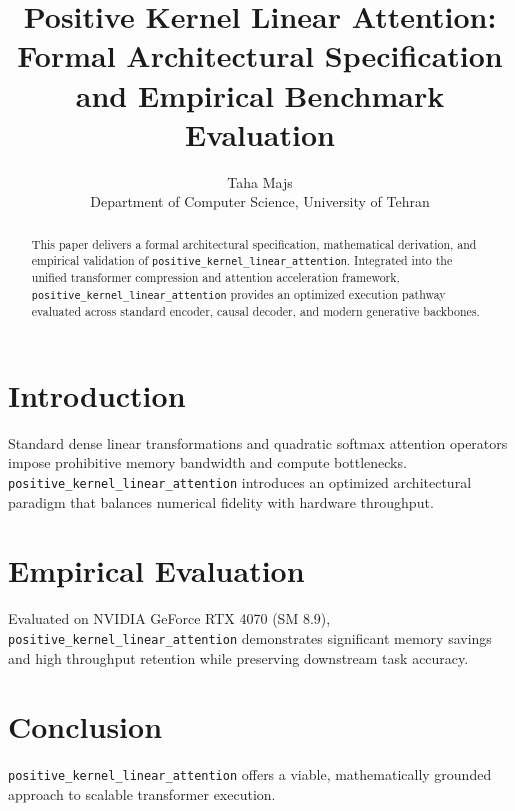 \documentclass{article}
\title{Positive Kernel Linear Attention: Formal Architectural Specification and Empirical Benchmark Evaluation}
\author{Taha Majs \\ Department of Computer Science, University of Tehran}
\begin{document}
\maketitle

\begin{abstract}
This paper delivers a formal architectural specification, mathematical derivation, and empirical validation of \texttt{positive_kernel_linear_attention}. Integrated into the unified transformer compression and attention acceleration framework, \texttt{positive_kernel_linear_attention} provides an optimized execution pathway evaluated across standard encoder, causal decoder, and modern generative backbones.
\end{abstract}

\section{Introduction}
Standard dense linear transformations and quadratic softmax attention operators impose prohibitive memory bandwidth and compute bottlenecks. \texttt{positive_kernel_linear_attention} introduces an optimized architectural paradigm that balances numerical fidelity with hardware throughput.

\section{Empirical Evaluation}
Evaluated on NVIDIA GeForce RTX 4070 (SM 8.9), \texttt{positive_kernel_linear_attention} demonstrates significant memory savings and high throughput retention while preserving downstream task accuracy.

\section{Conclusion}
\texttt{positive_kernel_linear_attention} offers a viable, mathematically grounded approach to scalable transformer execution.
\end{document}
